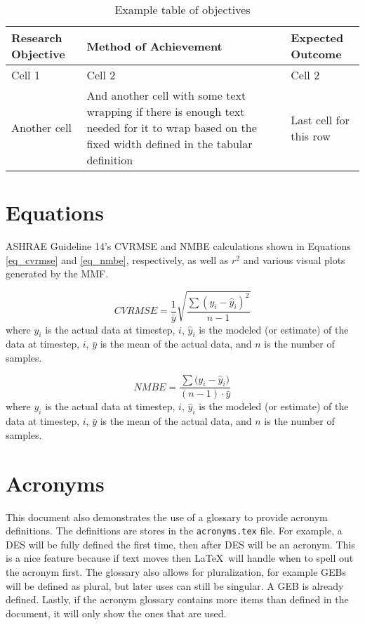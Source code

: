 \begin{table}[H]
	\centering
	\caption{Example table of objectives}
	\begin{tabular}{|L{4.5cm}|L{5.5cm}|L{5.0cm}|}
		\hline
		\textbf{Research Objective} & \textbf{Method of Achievement}  & \textbf{Expected Outcome}   \\ \hline \hline
		Cell 1 & Cell 2 & Cell 2 \\ \hline
		Another cell &
		And another cell with some text wrapping if there is enough text needed for it to wrap based on the fixed width defined in the tabular definition &
		Last cell for this row \\ \hline
	\end{tabular}
	\label{tbl_example}
\end{table}

\section{Equations}

ASHRAE Guideline 14's \cite{Landsberg2014} \gls{CVRMSE} and \gls{NMBE} calculations shown in Equations \ref{eq_cvrmse} and \ref{eq_nmbe}, respectively, as well as $r^2$ and various visual plots generated by the \gls{MMF}.

\begin{equation}
	\label{eq_cvrmse}
	CVRMSE=\frac{1}{\bar{y}}\sqrt{\frac{\sum{(y_i-\hat{y}_i)^2}}{n-1}}
\end{equation}
where $y_i$ is the actual data at timestep, $i$, $\hat{y}_i$ is the modeled (or estimate) of the data at timestep, $i$, $\bar{y}$ is the mean of the actual data, and $n$ is the number of samples.

\bigskip

\begin{equation}
	\label{eq_nmbe}
	NMBE=\frac{\sum{(y_i - \hat{y}_i})}{(n-1) \cdot \bar{y}}
\end{equation}
where $y_i$ is the actual data at timestep, $i$, $\hat{y}_i$ is the modeled (or estimate) of the data at timestep, $i$, $\bar{y}$ is the mean of the actual data, and $n$ is the number of samples.


\section{Acronyms}

This document also demonstrates the use of a glossary to provide acronym definitions. The definitions are stores in the \texttt{acronyms.tex} file. For example, a \gls{DES} will be fully defined the first time, then after \gls{DES} will be an acronym. This is a nice feature because if text moves then \LaTeX\ will handle when to spell out the acronym first. The glossary also allows for pluralization, for example \glspl{GEB} will be defined as plural, but later uses can still be singular. A \gls{GEB} is already defined. Lastly, if the acronym glossary contains more items than defined in the document, it will only show the ones that are used.

